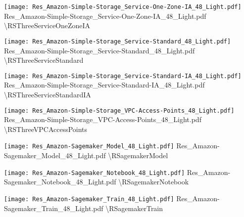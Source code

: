  {\texttt{[image: Res\_Amazon-Simple-Storage\_Service-One-Zone-IA\_48\_Light.pdf]}} {Res\_Amazon-Simple-Storage\_Service-One-Zone-IA\_48\_Light.pdf} {{\textbackslash}RSThreeServiceOneZoneIA}

 {\texttt{[image: Res\_Amazon-Simple-Storage\_Service-Standard\_48\_Light.pdf]}} {Res\_Amazon-Simple-Storage\_Service-Standard\_48\_Light.pdf} {{\textbackslash}RSThreeServiceStandard}

 {\texttt{[image: Res\_Amazon-Simple-Storage\_Service-Standard-IA\_48\_Light.pdf]}} {Res\_Amazon-Simple-Storage\_Service-Standard-IA\_48\_Light.pdf} {{\textbackslash}RSThreeServiceStandardIA}

 {\texttt{[image: Res\_Amazon-Simple-Storage\_VPC-Access-Points\_48\_Light.pdf]}} {Res\_Amazon-Simple-Storage\_VPC-Access-Points\_48\_Light.pdf} {{\textbackslash}RSThreeVPCAccessPoints}

 {\texttt{[image: Res\_Amazon-Sagemaker\_Model\_48\_Light.pdf]}} {Res\_Amazon-Sagemaker\_Model\_48\_Light.pdf} {{\textbackslash}RSagemakerModel}

 {\texttt{[image: Res\_Amazon-Sagemaker\_Notebook\_48\_Light.pdf]}} {Res\_Amazon-Sagemaker\_Notebook\_48\_Light.pdf} {{\textbackslash}RSagemakerNotebook}

 {\texttt{[image: Res\_Amazon-Sagemaker\_Train\_48\_Light.pdf]}} {Res\_Amazon-Sagemaker\_Train\_48\_Light.pdf} {{\textbackslash}RSagemakerTrain}


